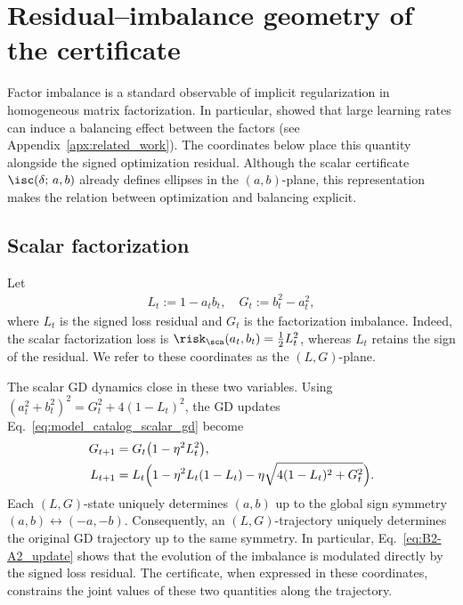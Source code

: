 \documentclass{article}
\begin{document}
\section{Residual--imbalance geometry of the certificate}
\label{sec:LG_plane}

Factor imbalance is a standard observable of implicit regularization in
homogeneous matrix factorization. In particular, \cite{wang2022large} showed
that large learning rates can induce a balancing effect between the factors (see Appendix~\ref{apx:related_work}).
The coordinates below place this quantity alongside the signed optimization
residual. Although the scalar certificate $\isc(\delta;\,a,b)$ already defines
ellipses in the $(a,b)$-plane, this representation makes the relation between
optimization and balancing explicit.

\subsection{Scalar factorization}
\label{subsec:LG_scalar}
Let
\begin{align}
    L_t := 1 - a_t b_t, \quad G_t := b_t^2 - a_t^2,
\end{align}
where $L_t$ is the signed loss residual and $G_t$ is the factorization
imbalance. Indeed, the scalar factorization loss is
$\risk_\sca(a_t,b_t)=\tfrac12 L_t^2$, whereas $L_t$ retains the sign of the
residual. We refer to these coordinates as the $(L,G)$-plane.

The scalar GD dynamics close in these two variables. Using
$(a_t^2 + b_t^2)^2 = G_t^2 + 4(1-L_t)^2$, the GD updates
Eq.~\eqref{eq:model_catalog_scalar_gd} become
\begin{align}
    G_{t+1} &= G_t\bigl(1 - \eta^2 L_t^2\bigr),
    \label{eq:B2-A2_update} \\
    L_{t+1} &= L_t\Bigl(1 - \eta^2 L_t(1 - L_t)
               - \eta\sqrt{4(1 - L_t)^2 + G_t^2}\Bigr).
    \label{eq:1-AB_update}
\end{align}
Each $(L,G)$-state uniquely determines $(a,b)$ up to the global sign symmetry
$(a,b)\leftrightarrow(-a,-b)$. Consequently, an $(L,G)$-trajectory uniquely
determines the original GD trajectory up to the same symmetry.
In particular, Eq.~\eqref{eq:B2-A2_update} shows that the evolution of the
imbalance is modulated directly by the signed loss residual. The certificate,
when expressed in these coordinates, constrains the joint values of these two
quantities along the trajectory.
\end{document}
